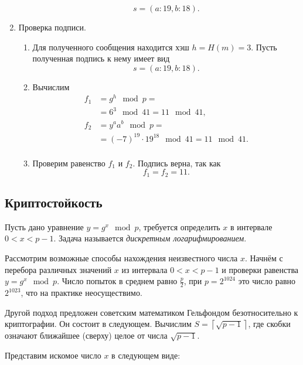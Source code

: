 \begin{enumerate}
\begin{enumerate}
                \[ s = (a:19, b:18). \]
        \end{enumerate}
    \item Проверка подписи.
        \begin{enumerate}
            \item Для полученного сообщения находится хэш $h = H(m) = 3$. Пусть полученная подпись к нему имеет вид
                \[ s = (a:19, b:18). \]
            \item Вычислим
                \[ \begin{array}{ll}
                    f_1 & = g^h \mod p = \\
                        & = 6^3 \mod 41 = 11 \mod 41, \\
                    f_2 & = y^a a^b \mod p = \\
                        & = (-7)^{19} \cdot 19^{18} \mod 41 = 11 \mod 41. \\
                \end{array} \]
            \item Проверим равенство $f_1$ и $f_2$. Подпись верна, так как
                \[ f_1 = f_2 = 11. \]
        \end{enumerate}
\end{enumerate}

\exampleend
{}

\subsection{Криптостойкость}

Пусть дано уравнение $y=g^{x} \mod p$, требуется определить $x$ в интервале $0 < x < p-1$. Задача называется \emph{дискретным логарифмированием}.

Рассмотрим возможные способы нахождения неизвестного числа $x$. Начнём с перебора различных значений $x$ из интервала $0<x<p-1$ и проверки равенства $y=g^{x} \mod p$. Число попыток в среднем равно $\frac{p}{2}$, при $p=2^{1024}$ это число равно $2^{1023}$, что на практике неосуществимо.

Другой подход предложен советским математиком Гельфондом безотносительно к криптографии. Он состоит в следующем.
Вычислим $S=\left\lceil\sqrt{p-1}\right\rceil $, где скобки означают ближайшее (сверху) целое от числа $\sqrt{p-1} $.

Представим искомое число $x$ в следующем виде:


